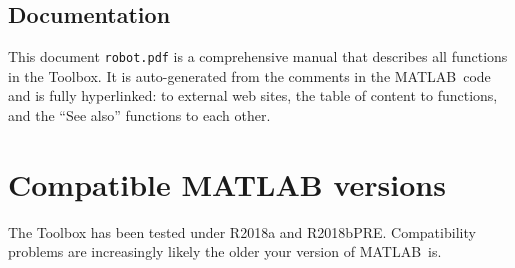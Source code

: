 \documentclass[a4paper,twoside]{report}
\def\Mlab{MATLAB}
\begin{document}
\subsection{Documentation}
This document {\tt robot.pdf} is a comprehensive manual that describes all functions in the Toolbox.
It is auto-generated from the comments in the \Mlab\ code and is fully hyperlinked:
to external web sites, the table of content to functions, and the ``See also'' functions
to each other.



\section{Compatible MATLAB versions}
The Toolbox has been tested under R2018a and R2018bPRE.  Compatibility problems are increasingly likely the older your version of \Mlab\ is.
\end{document}
